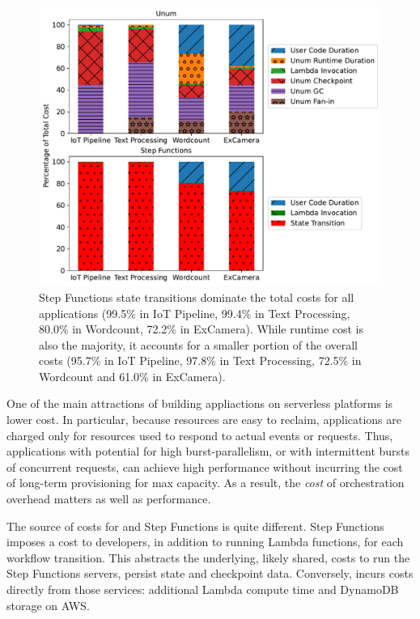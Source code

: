 \begin{figure}[t!]
    \centering
    \includegraphics[width=\columnwidth]{figures/AppCostBreakdown.pdf}
    \caption{Step Functions state transitions dominate the total costs for all
    applications (99.5\% in IoT Pipeline, 99.4\% in Text Processing, 80.0\% in
    Wordcount, 72.2\% in ExCamera). While \name{} runtime cost is also the
    majority, it accounts for a smaller portion of the overall costs (95.7\%
    in IoT Pipeline, 97.8\% in Text Processing, 72.5\%
    in Wordcount and 61.0\% in ExCamera).}
    \label{fig:cost-breakdown}
\end{figure}

One of the main attractions of building appliactions on serverless platforms
is lower cost. In particular, because resources are easy to reclaim,
applications are charged only for resources used to respond to actual events
or requests. Thus, applications with potential for high burst-parallelism, or
with intermittent bursts of concurrent requests, can achieve high performance
without incurring the cost of long-term provisioning for max capacity. As a
result, the \emph{cost} of orchestration overhead matters as well as
performance.

The source of costs for \name{} and Step Functions is quite different. Step
Functions imposes a cost to developers, in addition to running Lambda
functions, for each workflow transition. This abstracts the underlying, likely
shared, costs to run the Step Functions servers, persist state and checkpoint
data. Conversely, \name{} incurs costs directly from those services:
additional Lambda compute time and DynamoDB storage on AWS.


